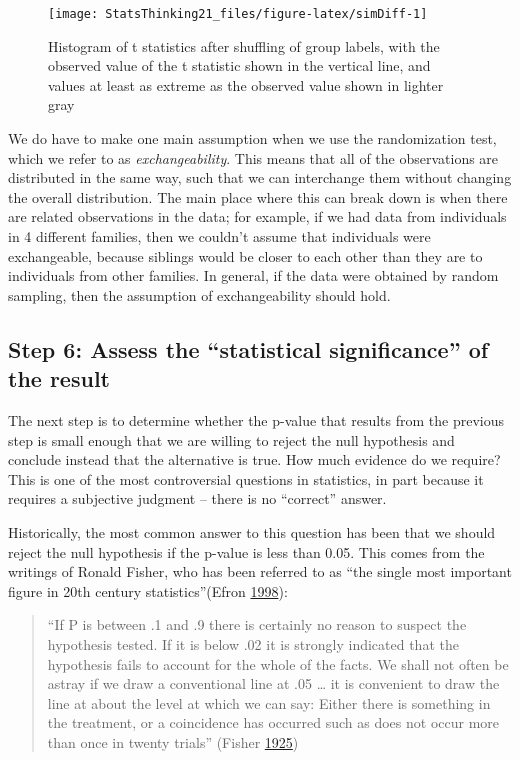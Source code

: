 \documentclass[12pt,]{book}
\theoremstyle{definition}
\theoremstyle{definition}
\theoremstyle{definition}
\theoremstyle{remark}
\begin{document}
\begin{figure}
\texttt{[image: StatsThinking21\_files/figure-latex/simDiff-1]} \caption{Histogram of t statistics after shuffling of group labels, with the observed value of the t statistic shown in the vertical line, and values at least as extreme as the observed value shown in lighter gray}\label{fig:simDiff}
\end{figure}

We do have to make one main assumption when we use the randomization test, which we refer to as \emph{exchangeability}. This means that all of the observations are distributed in the same way, such that we can interchange them without changing the overall distribution. The main place where this can break down is when there are related observations in the data; for example, if we had data from individuals in 4 different families, then we couldn't assume that individuals were exchangeable, because siblings would be closer to each other than they are to individuals from other families. In general, if the data were obtained by random sampling, then the assumption of exchangeability should hold.

\hypertarget{step-6-assess-the-statistical-significance-of-the-result}{%
\subsection{Step 6: Assess the ``statistical significance'' of the result}\label{step-6-assess-the-statistical-significance-of-the-result}}

The next step is to determine whether the p-value that results from the previous step is small enough that we are willing to reject the null hypothesis and conclude instead that the alternative is true. How much evidence do we require? This is one of the most controversial questions in statistics, in part because it requires a subjective judgment -- there is no ``correct'' answer.

Historically, the most common answer to this question has been that we should reject the null hypothesis if the p-value is less than 0.05. This comes from the writings of Ronald Fisher, who has been referred to as ``the single most important figure in 20th century statistics''(Efron \protect\hyperlink{ref-efron1998}{1998}):

\begin{quote}
``If P is between .1 and .9 there is certainly no reason to suspect the hypothesis tested. If it is below .02 it is strongly indicated that the hypothesis fails to account for the whole of the facts. We shall not often be astray if we draw a conventional line at .05 \ldots{} it is convenient to draw the line at about the level at which we can say: Either there is something in the treatment, or a coincidence has occurred such as does not occur more than once in twenty trials'' (Fisher \protect\hyperlink{ref-fisher1925statistical}{1925})
\end{quote}
\end{document}
